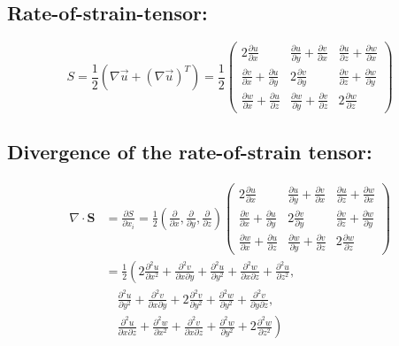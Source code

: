\documentclass{article}
\begin{document}
\subsection{Rate-of-strain-tensor:}
    \begin{equation}
        S = \frac{1}{2} \left(\nabla \vec{u} + (\nabla \vec{u})^T\right) = \frac{1}{2} \begin{pmatrix} 
            2 \frac{\partial u}{\partial x} & \frac{\partial u}{\partial y} + \frac{\partial v}{\partial x} & \frac{\partial u}{\partial z} + \frac{\partial w}{\partial x} \\
            \frac{\partial v}{\partial x} + \frac{\partial u}{\partial y} & 2 \frac{\partial v}{\partial y} & \frac{\partial v}{\partial z} + \frac{\partial w}{\partial y} \\
            \frac{\partial w}{\partial x} + \frac{\partial u}{\partial z} & \frac{\partial w}{\partial y} + \frac{\partial v}{\partial z} & 2 \frac{\partial w}{\partial z}
            \end{pmatrix}
    \end{equation}
\subsection{Divergence of the rate-of-strain tensor:}
    \begin{equation}
        \begin{aligned}
        \nabla \cdot \mathbf{S} &= \frac{\partial S}{\partial x_i} = \frac{1}{2} \left(\frac{\partial}{\partial x}, \frac{\partial}{\partial y}, \frac{\partial}{\partial z}\right) \begin{pmatrix} 
        2 \frac{\partial u}{\partial x} & \frac{\partial u}{\partial y} + \frac{\partial v}{\partial x} & \frac{\partial u}{\partial z} + \frac{\partial w}{\partial x} \\
        \frac{\partial v}{\partial x} + \frac{\partial u}{\partial y} & 2 \frac{\partial v}{\partial y} & \frac{\partial v}{\partial z} + \frac{\partial w}{\partial y} \\
        \frac{\partial w}{\partial x} + \frac{\partial u}{\partial z} & \frac{\partial w}{\partial y} + \frac{\partial v}{\partial z} & 2 \frac{\partial w}{\partial z}
        \end{pmatrix} \\
        &= \frac{1}{2}\left(2\frac{\partial^2 u}{\partial x^2} + \frac{\partial^2 v}{\partial x \partial y} + \frac{\partial^2 u}{\partial y^2} + \frac{\partial^2 w}{\partial x \partial z} + \frac{\partial^2 u}{\partial z^2}, \right. \\
        &\quad \left. \frac{\partial^2 u}{\partial y^2} + \frac{\partial^2 v}{\partial x \partial y} + 2 \frac{\partial^2 v}{\partial y^2} + \frac{\partial^2 w}{\partial y^2} + \frac{\partial^2 v}{\partial y \partial z}, \right. \\
        &\quad \left. \frac{\partial^2 u}{\partial x \partial z} + \frac{\partial^2 w}{\partial x^2} + \frac{\partial^2 v}{\partial x \partial z} + \frac{\partial^2 w}{\partial y^2} + 2 \frac{\partial^2 w}{\partial z^2}\right)
        \end{aligned}
        \end{equation}
\end{document}
